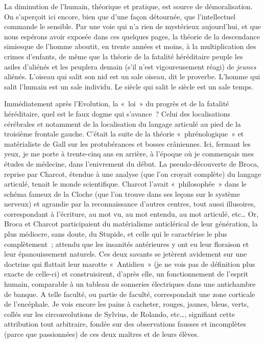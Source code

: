 \documentclass[french,twoside]{book} %
\begin{document}
La diminution de l’humain, théorique et pratique, est source de démoralisation. On s’aperçoit ici encore, bien que d’une façon détournée, que l’intellectuel commande le sensible. Par une voie qui n’a rien de mystérieux aujourd’hui, et que nous espérons avoir exposée dans ces quelques pages, la théorie de la descendance simiesque de l’homme aboutit, en trente années et moins, à la multiplication des crimes d’enfants, de même que la théorie de la fatalité héréditaire peuple les asiles d’aliénés et les peuplera demain (s’il n’est vigoureusement réagi) de {\itshape jeunes} aliénés. L’oiseau qui salit son nid est un sale oiseau, dit le proverbe. L’homme qui salit l’humain est un sale individu. Le siècle qui salit le siècle est un sale temps.\par
Immédiatement après l’Evolution, la « loi » du progrès et de la fatalité héréditaire, quel est le faux dogme qui s’avance ? Celui des localisations cérébrales et notamment de la localisation du langage articulé au pied de la troisième frontale gauche. C’était la suite de la théorie « phrénologique » et matérialiste de Gall sur les protubérances et bosses crâniennes. Ici, fermant les yeux, je me porte à trente-cinq ans en arrière, à l’époque où je commençais mes études de médecine, dans l’enivrement du début. La pseudo-découverte de Broca, reprise par Charcot, étendue à une analyse (que l’on croyait complète) du langage articulé, tenait le monde scientifique. Charcot l’avait « philosophée » dans le schéma fameux de la Cloche (que l’on trouve dans ses leçons sur le système nerveux) et agrandie par la reconnaissance d’autres centres, tout aussi illusoires, correspondant à l’écriture, au mot vu, au mot entendu, au mot articulé, etc… Or, Broca et Charcot participaient du matérialisme anticlérical de leur génération, la plus médiocre, sans doute, du Stupide, et celle qui le caractérise le plus complètement ; attendu que les insanités antérieures y ont eu leur floraison et leur épanouissement naturels. Ces deux savants se jetèrent avidement sur une doctrine qui flattait leur marotte « Antidieu » (je ne vois pas de définition plus exacte de celle-ci) et construisirent, d’après elle, un fonctionnement de l’esprit humain, comparable à un tableau de sonneries électriques dans une antichambre de banque. A telle faculté, ou partie de faculté, correspondait une zone corticale de l’encéphale. Je vois encore les pains à cacheter, rouges, jaunes, bleus, verts, collés sur les circonvolutions de Sylvius, de Rolando, etc…, signifiant cette attribution tout arbitraire, fondée sur des observations fausses et incomplètes (parce que passionnées) de ces deux maîtres et de leurs élèves.\par
\end{document}
